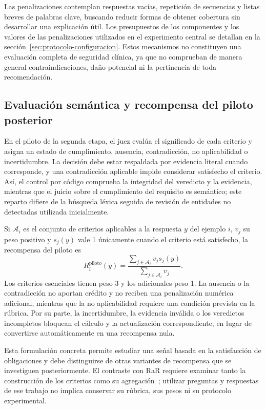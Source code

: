 Las penalizaciones contemplan respuestas vacías, repetición de secuencias y listas breves de palabras clave, buscando reducir formas de obtener cobertura sin desarrollar una explicación útil. Los presupuestos de los componentes y los valores de las penalizaciones utilizados en el experimento central se detallan en la sección~\ref{sec:protocolo-configuracion}. Estos mecanismos no constituyen una evaluación completa de seguridad clínica, ya que no comprueban de manera general contraindicaciones, daño potencial ni la pertinencia de toda recomendación.


\subsection{Evaluación semántica y recompensa del piloto posterior}
En el piloto de la segunda etapa, el juez evalúa el significado de cada criterio y asigna un estado de cumplimiento, ausencia, contradicción, no aplicabilidad o incertidumbre. La decisión debe estar respaldada por evidencia literal cuando corresponde, y una contradicción aplicable impide considerar satisfecho el criterio. Así, el control por código comprueba la integridad del veredicto y la evidencia, mientras que el juicio sobre el cumplimiento del requisito es semántico; este reparto difiere de la búsqueda léxica seguida de revisión de entidades no detectadas utilizada inicialmente.

Si $\mathcal{A}_i$ es el conjunto de criterios aplicables a la respuesta $y$ del ejemplo $i$, $v_j$ su peso positivo y $s_j(y)$ vale 1 únicamente cuando el criterio está satisfecho, la recompensa del piloto es
\begin{equation}
R_i^{\mathrm{piloto}}(y)=
\frac{\sum_{j\in\mathcal{A}_i}v_j s_j(y)}{\sum_{j\in\mathcal{A}_i}v_j}.
\label{eq:metodo-recompensa-piloto}
\end{equation}
Los criterios esenciales tienen peso 3 y los adicionales peso 1. La ausencia o la contradicción no aportan crédito y no reciben una penalización numérica adicional, mientras que la no aplicabilidad requiere una condición prevista en la rúbrica. Por su parte, la incertidumbre, la evidencia inválida o los veredictos incompletos bloquean el cálculo y la actualización correspondiente, en lugar de convertirse automáticamente en una recompensa nula.

Esta formulación concreta permite estudiar una señal basada en la satisfacción de obligaciones y debe distinguirse de otras variantes de recompensa que se investiguen posteriormente. El contraste con RaR requiere examinar tanto la construcción de los criterios como su agregación~\cite{gunjal2025rar}; utilizar preguntas y respuestas de ese trabajo no implica conservar su rúbrica, sus pesos ni su protocolo experimental.
